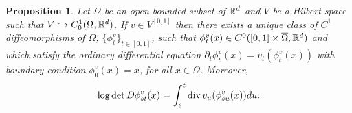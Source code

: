 \documentclass[noinfoline]{imsart}
\newtheorem{proposition}{Proposition}
\begin{document}
\begin{proposition}
\label{PropDef} Let $\Omega$ be an open bounded subset of $\Bbb R^d$ and $V$ be a Hilbert space such that  $V\hookrightarrow C_0^1(\Omega,\Bbb R^d)$. If   $v\in V^{[0,1]}$ then there exists a unique  class of $C^1$ diffeomorphisms of $\Omega$,  $\{\phi_{t}^v\}_{t\in [0,1]}$, such that  $\phi_t^v(x)\in C^0 ([0,1]\times \overline \Omega,\Bbb R^d)$ and  which satisfy the ordinary differential equation $
 \partial_t \phi_t^v(x) = v_t(\phi_t^v(x)) $ with boundary condition $\phi_0^v(x)=x$, for all $x\in \Omega$.
Moreover,
 \begin{equation}
 \label{div}
  \log\det D\phi_{st}^v(x)  = \int_s^t  \text{\rm div}\,  v_u (\phi_{su}^v(x))du.
  \end{equation}
 \end{proposition}
\end{document}
